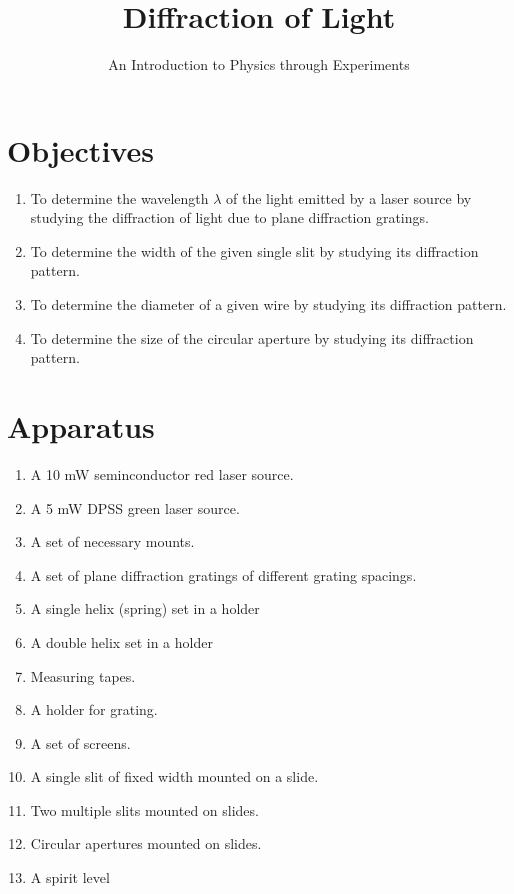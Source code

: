\title{Diffraction of Light}
\author{An Introduction to Physics through Experiments}
\date{}
\maketitle

\section*{Objectives}

\begin{enumerate}
    \item To determine the wavelength $\lambda$ of the light emitted by a laser source by studying the diffraction of light due to plane diffraction gratings.
    \item To determine the width of the given single slit by studying its diffraction pattern.
    \item To determine the diameter of a given wire by studying its diffraction pattern.
    \item To determine the size of the circular aperture by studying its diffraction pattern.
\end{enumerate}



\section*{Apparatus}

\begin{enumerate}
    \item A 10 mW seminconductor red laser source.
    \item A 5 mW DPSS green laser source.
    \item A set of necessary mounts.
    \item A set of plane diffraction gratings of different grating spacings.
    \item A single helix (spring) set in a holder
    \item A double helix set in a holder
    \item Measuring tapes.
    \item A holder for grating.
    \item A set of screens.  
    \item A single slit of fixed width mounted on a slide.
    \item Two multiple slits mounted on slides.
    \item Circular apertures mounted on slides.
    \item A spirit level
\end{enumerate}

